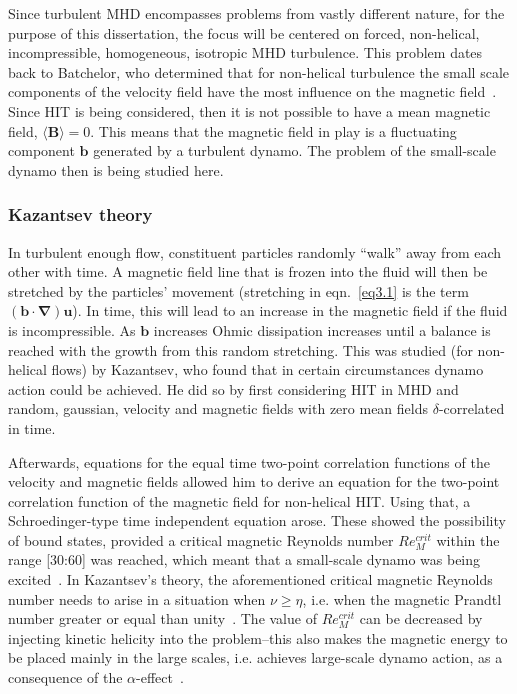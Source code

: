 \documentclass[12pt,a4paper]{report}
\begin{document}
Since turbulent MHD encompasses problems from vastly different nature, for the purpose of this dissertation, the focus will be centered on forced, non-helical, incompressible, homogeneous, isotropic MHD turbulence. This problem dates back to Batchelor, who determined that for non-helical turbulence the small scale components of the velocity field have the most influence on the magnetic field~\cite{batchelor1950spontaneous}. Since HIT is being considered, then it is not possible to have a mean magnetic field, $\langle \bm B \rangle = 0$. This means that the magnetic field in play is a fluctuating component $\bm b$ generated by a turbulent dynamo. The problem of the small-scale dynamo then is being studied here. 

\subsubsection{Kazantsev theory}

In turbulent enough flow, constituent particles randomly ``walk'' away from each other with time. A magnetic field line that is frozen into the fluid will then be stretched by the particles' movement (stretching in eqn.~\ref{eq3.1} is the term $(\bm b \cdot \bm \nabla)\bm u$). In time, this will lead to an increase in the magnetic field if the fluid is incompressible. As $\bm b$ increases Ohmic dissipation increases until a balance is reached with the growth from this random stretching. This was studied (for non-helical flows) by Kazantsev, who found that in certain circumstances dynamo action could be achieved. He did so by first considering HIT in MHD and random, gaussian, velocity and magnetic fields with zero mean fields $\delta$-correlated in time. 

Afterwards, equations for the equal time two-point correlation functions of the velocity and magnetic fields allowed him to derive an equation for the two-point correlation function of the magnetic field for non-helical HIT. Using that, a Schroedinger-type time independent equation arose. These showed the possibility of bound states, provided a critical magnetic Reynolds number $Re_M^{crit}$ within the range [30:60] was reached, which meant that a small-scale dynamo was being excited~\cite{brandenburg2005astrophysical, kazantsev1968enhancement}. In Kazantsev's theory, the aforementioned critical magnetic Reynolds number needs to arise in a situation when $\nu \geq \eta$, i.e. when the magnetic Prandtl number greater or equal than unity~\cite{kazantsev1968enhancement}. The value of $Re_M^{crit}$ can be decreased by injecting kinetic helicity into the problem--this also makes the magnetic energy to be placed mainly in the large scales, i.e. achieves large-scale dynamo action, as a consequence of the $\alpha$-effect~\cite{leorat1981fully}.
\end{document}
